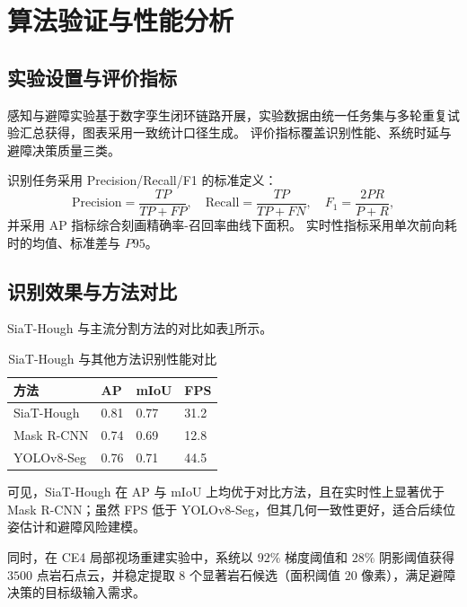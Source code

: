 \section{算法验证与性能分析}
\label{sec:ch5_validation}

\subsection{实验设置与评价指标}
\label{subsec:ch5_eval_setup}

感知与避障实验基于数字孪生闭环链路开展，实验数据由统一任务集与多轮重复试验汇总获得，图表采用一致统计口径生成。
评价指标覆盖识别性能、系统时延与避障决策质量三类。

识别任务采用 Precision/Recall/F1 的标准定义：
\begin{equation}
\mathrm{Precision}=\frac{TP}{TP+FP},\quad
\mathrm{Recall}=\frac{TP}{TP+FN},\quad
F_1=\frac{2PR}{P+R},
\label{eq:ch5_prf}
\end{equation}
并采用 AP 指标综合刻画精确率-召回率曲线下面积。
实时性指标采用单次前向耗时的均值、标准差与 $P95$。

\subsection{识别效果与方法对比}
\label{subsec:ch5_detection_compare}

SiaT-Hough 与主流分割方法的对比如表\ref{tab:ch5_method_compare}所示。

\begin{table}[H]
	\centering
	\small
	\caption{SiaT-Hough 与其他方法识别性能对比}
	\label{tab:ch5_method_compare}
	\begin{tabular}{p{}p{}p{}p{}}
		\toprule
		方法 & AP & mIoU & FPS \\
		\midrule
		SiaT-Hough & 0.81 & 0.77 & 31.2 \\
		Mask R-CNN & 0.74 & 0.69 & 12.8 \\
		YOLOv8-Seg & 0.76 & 0.71 & 44.5 \\
		\bottomrule
	\end{tabular}
\end{table}

可见，SiaT-Hough 在 AP 与 mIoU 上均优于对比方法，且在实时性上显著优于 Mask R-CNN；虽然 FPS 低于 YOLOv8-Seg，但其几何一致性更好，适合后续位姿估计和避障风险建模。

同时，在 CE4 局部视场重建实验中，系统以 $92\%$ 梯度阈值和 $28\%$ 阴影阈值获得 $3500$ 点岩石点云，并稳定提取 $8$ 个显著岩石候选（面积阈值 $20$ 像素），满足避障决策的目标级输入需求。

